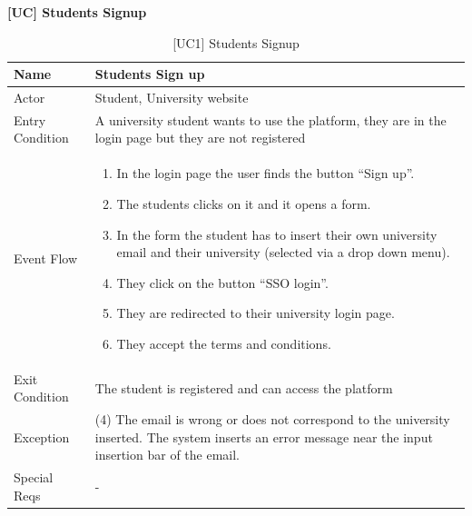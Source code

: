 
\newcommand{\nextUseCases}{}

\textbf{[UC\nextUseCases] Students Signup}
\begin{table}[H] %
    \centering
    \begin{tabular}{|p{3cm}|p{10cm}|} 
    \hline
    Name & Students Sign up \\ \hline
    Actor  & Student, University website\\ \hline
    Entry Condition  & A university student wants to use the platform, they are in the login page but they are not registered \\ \hline
    Event Flow  & 
    \begin{enumerate}[noitemsep, topsep=0pt]
        \item In the login page the user finds the button “Sign up”.
        \item The students clicks on it and it opens a form.
        \item In the form the student has to insert their own university email and their university (selected via a drop down menu).
        \item They click on the button “SSO login”.
        \item They are redirected to their university login page.
        \item They accept the terms and conditions.
    \end{enumerate} \\ \hline
    Exit Condition  & The student is registered and can access the platform \\ \hline
    Exception  & (4) The email is wrong or does not correspond to the university inserted. The system inserts an error message near the input insertion bar of the email. \\ \hline
    Special Reqs  & - \\ \hline
    \end{tabular}
    \caption{[UC1] Students Signup}
\end{table}

